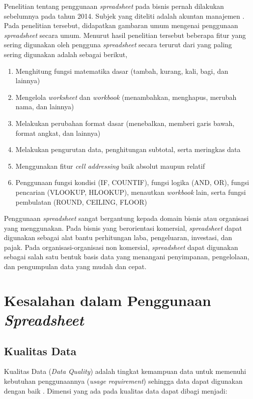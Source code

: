 Penelitian tentang penggunaan \textit{spreadsheet} pada bisnis pernah dilakukan sebelumnya pada tahun 2014. Subjek yang diteliti adalah akuntan manajemen \parencite{Bradbard2014}. Pada penelitian tersebut, didapatkan gambaran umum mengenai penggunaan \textit{spreadsheet} secara umum. Menurut hasil penelitian tersebut beberapa fitur yang sering digunakan oleh pengguna \textit{spreadsheet} secara terurut dari yang paling sering digunakan adalah sebagai berikut,

\begin{enumerate}
    \item Menghitung fungsi matematika dasar (tambah, kurang, kali, bagi, dan lainnya)
    \item Mengelola \textit{worksheet} dan \textit{workbook} (menambahkan, menghapus, merubah nama, dan lainnya)
    \item Melakukan perubahan format dasar (menebalkan, memberi garis bawah, format angkat, dan lainnya)
    \item Melakukan pengurutan data, penghitungan subtotal, serta meringkas data
    \item Menggunakan fitur \textit{cell addressing} baik absolut maupun relatif
    \item Penggunaan fungsi kondisi (IF, COUNTIF), fungsi logika (AND, OR), fungsi pencarian (VLOOKUP, HLOOKUP), menautkan \textit{workbook} lain, serta fungsi pembulatan (ROUND, CEILING, FLOOR)
\end{enumerate}

Penggunaan \textit{spreadsheet} sangat bergantung kepada domain bisnis atau organisasi yang menggunakan. Pada bisnis yang berorientasi komersial, \textit{spreadsheet} dapat digunakan sebagai alat bantu perhitungan laba, pengeluaran, investasi, dan pajak. Pada organisasi-organisasi non komersial, \textit{spreadsheet} dapat digunakan sebagai salah satu bentuk basis data yang menangani penyimpanan, pengelolaan, dan pengumpulan data yang mudah dan cepat.

\section{Kesalahan dalam Penggunaan \textit{Spreadsheet}}
\subsection{Kualitas Data}
Kualitas Data (\textit{Data Quality}) adalah tingkat kemampuan data untuk memenuhi kebutuhan penggunaannya (\textit{usage requirement}) sehingga data dapat digunakan dengan baik \parencite{Khatri2010}. Dimensi yang ada pada kualitas data dapat dibagi menjadi:

